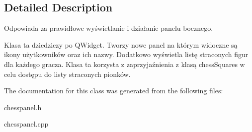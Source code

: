 \subsection{Detailed Description}
Odpowiada za prawidłowe wyświetlanie i działanie panelu bocznego. 

Klasa ta dziedziczy po Q\+Widget. Tworzy nowe panel na którym widoczne są ikony użytkowników oraz ich nazwy. Dodatkowo wyświetla listę straconych figur dla każdego gracza. Klasa ta korzysta z zaprzyjaźnienia z klasą chess\+Squares w celu dostępu do listy straconych pionków. 

The documentation for this class was generated from the following files\+:\begin{DoxyCompactItemize}
\item 
chesspanel.\+h\item 
chesspanel.\+cpp\end{DoxyCompactItemize}
